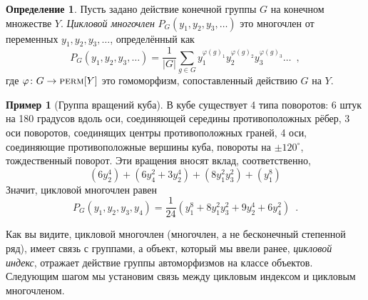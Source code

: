 \documentclass[a5paper]{article}
\theoremstyle{definition}
\newtheorem{example}{Пример}
\newtheorem*{definition}{Определение}
\begin{document}
\begin{definition}
Пусть задано действие конечной группы \( G \) на конечном множестве \( Y \).
\textit{Цикловой многочлен} \( P_{G} (y_1, y_2, y_3, \ldots) \) это многочлен от
переменных \(y_1, y_2, y_3, \ldots \), определённый как
\[
    P_{G} (y_1, y_2, y_3, \ldots) = \dfrac{1}{|G|} 
    \sum_{g \in G} y_1^{\varphi(g)_1} y_2^{\varphi(g)_2} y_3^{\varphi(g)_3}
\ldots \enspace ,
\]
где \( \varphi \colon G \to \text{\textsc{perm}}[Y] \) это гомоморфизм,
сопоставленный действию \( G \) на \( Y \).
\end{definition}
\begin{example}[Группа вращений куба]
    В кубе существует 4 типа поворотов: 6 штук на 180 градусов вдоль оси,
соединяющей середины противоположных рёбер, 3 оси поворотов, соединящих
центры противоположных граней, 4 оси, соединяющие противоположные вершины куба,
повороты на \( \pm 120^\circ \), тождественный поворот. Эти вращения вносят
вклад, соответственно,
\[
    (6y_2^4) + (6y_4^2 + 3y_2^4) + (8y_1^2 y_3^2) + (y_1^8)
\]
Значит, цикловой многочлен равен
\[
    P_{G} (y_1, y_2, y_3, y_4) = \dfrac{1}{24}
    (y_1^8 + 8 y_1^2 y_3^2 + 9 y_2^4 + 6 y_4^2) \enspace .
\]
\end{example}

Как вы видите, цикловой многочлен (многочлен, а не бесконечный степенной ряд),
имеет связь с группами, а объект, который мы ввели ранее, \textit{цикловой
индекс}, отражает действие группы автоморфизмов на классе объектов. Следующим
шагом мы установим связь между цикловым индексом и цикловым многочленом. 
\end{document}
